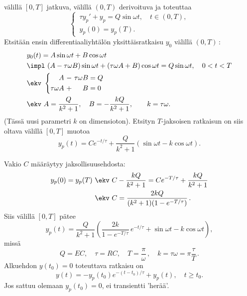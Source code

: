 välillä $[0,T]$ jatkuva, välillä $(0,T)$ derivoituva ja toteuttaa
\[
\begin{cases}
\,\tau y_p'+y_p = Q\sin \omega t,\quad t\in (0,T), \\ \,y_p(0) =y_p(T).
\end{cases}
\]
Etsitään ensin differentiaaliyhtälön yksittäisratkaisu $y_0$ välillä $(0,T)\,$:
\begin{align*}
&y_0(t) =A\sin \omega t + B\cos \omega t \\
&\impl \ (A-\tau\omega B)\sin \omega t + (\tau\omega A+B)\cos\omega t 
                                                    = Q\sin \omega t,\quad 0<t<T \\
&\ekv \ \left\{ \begin{alignedat}{3}
&A \ - \ & \tau\omega&B & &=Q \\
\tau\omega&A \ + \ & &B & &=0
\end{alignedat} \right. \\ 
&\ekv \ A=\frac{Q}{k^2+1},\quad B=-\frac{kQ}{k^2+1},\qquad k=\tau\omega.
\end{align*}
(Tässä uusi parametri $k$ on dimensioton). Etsityn $T$-jaksoisen ratkaisun on siis oltava 
välillä $[0,T]$ muotoa
\[
y_p(t)=Ce^{-t/\tau}+\frac{Q}{k^2+1}(\sin \omega t-k\cos \omega t).
\]

Vakio $C$ määräytyy jaksollisuusehdosta:
\begin{align*}
y_p(0)=y_p(T) \ &\ekv \ C-\frac{kQ}{k^2+1} = Ce^{-T/\tau}+\frac{kQ}{k^2+1} \\
&\ekv \ C=\frac{2kQ}{(k^2+1)(1-e^{-T/\tau})}\,.
\end{align*}
Siis välillä $[0,T]$ pätee
\[
y_p(t) = \frac{Q}{k^2+1}
         \left(\frac{2k}{1-e^{-T/\tau}}\,e^{-t/\tau}+\sin \omega t-k\cos \omega t\right),
\]
missä
\[
Q=EC, \quad \tau=RC, \quad T=\frac{\pi}{\omega}\,,\quad k=\tau\omega=\pi\frac{\tau}{T}\,.
\]
Alkuehdon $y(t_0)=0$ toteuttava ratkaisu on
\[
y(t)=-y_p(t_0)e^{-(t-t_0)/\tau}+y_p(t),\quad t\geq t_0.
\]
Jos sattuu olemaan $y_p(t_0)=0$, ei transientti 'herää'. \loppu

